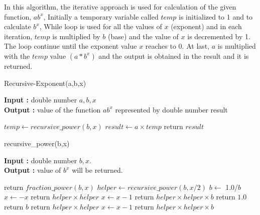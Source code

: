 \documentclass[12pt, a4paper]{article}
\begin{document}
\noindent
In this algorithm, the iterative approach is used for calculation of the given function, $ab^x$, Initially a temporary  variable called $temp$ is initialized to 1 and to calculate $b^x$, While loop is used for all the values of $x$ (exponent) and in each iteration, $temp$ is multiplied by $b$ (base) and the value of $x$ is decremented by 1. The loop continue until the exponent value $x$ reaches to 0. At last, $a$ is multiplied with the $temp$ value $(a*b^x)$ and the output is obtained in the result and it is returned.

\vspace{90mm}


\begin{algorithm}[hbt!]
	\caption{Recursive-Exponent(a,b,x)}\label{alg:two}
	
	\hspace*{\algorithmicindent} \textbf{Input : }double number $a,b,x$ \\
	\hspace*{\algorithmicindent} \textbf{Output : }value of the function $ab^x$ represented by double number result
	\begin{algorithmic}[1]
		\STATE $temp \gets recursive\_power(b,x)$
		\STATE $result \gets a \times temp$
		\STATE return $result$
	\end{algorithmic}
\end{algorithm}

\newpage


\begin{algorithm}[hbt!]
	\renewcommand{\thealgorithm}{2.1}
	\caption{recursive\_power(b,x)}\label{alg:two}
	
	\hspace*{\algorithmicindent} \textbf{Input : }double number $b,x$. \\
	\hspace*{\algorithmicindent} \textbf{Output : }value of $b^x$ will be returned.
	\begin{algorithmic}[1]
		\STATE return $ fraction\_power(b,x) $
		\ENDIF
		\STATE $helper \gets recursive\_power(b,x/2)$
		\STATE $ b  \gets $ 1.0/$ b $
		\STATE $ x  \gets  - x $
		\STATE return $helper \times helper$
		\ELSE
		\STATE $x \gets x - 1$
		\STATE return $helper \times helper \times b$
		\ENDIF
		\STATE return $1.0$
		\STATE return $b$
		\STATE return $helper \times helper$
		\ELSE
		\STATE $x \gets x - 1$
		\STATE return $helper \times helper \times b$
		\ENDIF
	\end{algorithmic}
\end{algorithm}
\end{document}
